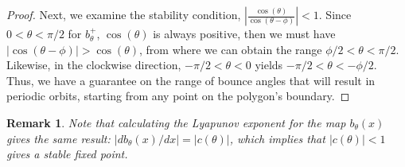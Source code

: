 \documentclass[letterpaper, 10 pt, conference]{ieeeconf}  %
\newtheorem{remark}{\bf Remark}
\begin{document}
\begin{proof}
Next, we examine the stability condition,
$|\frac{\cos(\theta)}{\cos(\theta-\phi)}| < 1$. 
Since $0 < \theta < \pi/2$ for $b^+_{\theta}$, $\cos(\theta)$ is always
positive, then we must have $|\cos(\theta-\phi)| > \cos(\theta)$, from where we 
can obtain the range $\phi/2 < \theta < \pi/2$. Likewise, in the clockwise 
direction, $-\pi/2 < \theta < 0$ yields $-\pi/2 <
\theta < -\phi/2$. Thus, we have a guarantee on the range of bounce angles that
will result in periodic orbits, starting from any point on the polygon's
boundary.
\end{proof}

\begin{remark}
Note that calculating the Lyapunov exponent \cite{jackson1992} for the map $b_{\theta}(x)$
gives the same result: $|db_{\theta}(x)/dx| = |c(\theta)|$, which implies that
$|c(\theta)| < 1$ gives a stable fixed point.
\end{remark}
\end{document}
